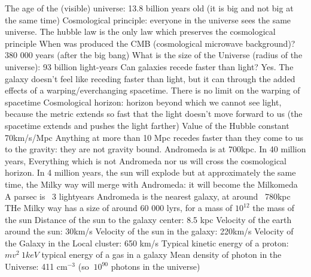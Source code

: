 \documentclass[a4paper]{book}
\theoremstyle{definition}
\theoremstyle{remark}
\begin{document}
The age of the (visible) universe: 13.8 billion years old (it is big and not big at the same time)  \newline
Cosmological principle: everyone in the universe sees the same universe. \newline 
The hubble law is the only law which preserves the cosmological principle\newline 
When was produced the CMB (cosmological microwave background)? 380 000 years (after the big bang) \newline 
What is the size of the Universe (radius of the universe): 93 billion light-years \newline 
Can galaxies recede faster than light? Yes. The galaxy doesn't feel like receding faster than light, but it can through the added effects of a warping/everchanging spacetime. There is no limit on the warping of spacetime \newline 
Cosmological horizon: horizon beyond which we cannot see light, because the metric extends so fast that the light doesn't move forward to us (the spacetime extends and pushes the light farther) \newline
Value of the Hubble constant ~ 70km/s/Mpc \newline
Anything at more than 10 Mpc recedes faster than they come to us to the gravity: they are not gravity bound. Andromeda is at 700kpc. In 40 million years, Everything which is not Andromeda nor us will cross the cosmological horizon. In 4 million years, the sun will explode but at approximately the same time, the Milky way will merge with Andromeda: it will become the Milkomeda \newline
A parsec is ~3 lightyears \newline 
Andromeda is the nearest galaxy, at around ~780kpc \newline
THe Milky way has a size of around 60 000 lyrs, for a mass of $10^12$ the mass of the sun \newline
Distance of the sun to the galaxy center: 8.5 kpc \newline 
Velocity of the earth around the sun: 30km/s \newline 
Velocity of the sun in the galaxy: 220km/s \newline 
Velocity of the Galaxy in the Local cluster: 650 km/s \newline 
Typical kinetic energy of a proton: $mv^2 ~ 1keV$ typical energy of a gas in a galaxy\newline 
Mean density of photon in the Universe: 411 cm$^{-3}$ (so $~10^90$ photons in the universe)\newline 
\end{document}

